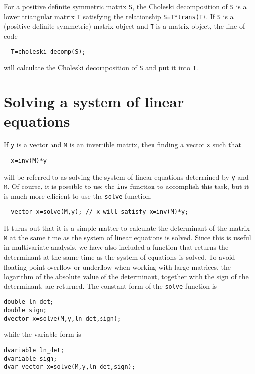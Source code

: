 \documentclass{admbmanual}
\begin{document}
For a positive definite symmetric matrix \texttt{S}, the
Choleski decomposition of \texttt{S} is a lower triangular matrix \texttt{T}
satisfying the relationship \texttt{S=T*trans(T)}. 
If \texttt{S} is a (positive definite symmetric) matrix object and
\texttt{T} is a matrix object, the line of code
\begin{lstlisting}
  T=choleski_decomp(S);
\end{lstlisting}
will calculate the Choleski decomposition of \texttt{S} and put it
into \texttt{T}.


\section{Solving a system of linear equations}

If \texttt{y} is a vector and \texttt{M} is an invertible matrix, then finding
a vector \texttt{x} such that
\begin{lstlisting}
  x=inv(M)*y
\end{lstlisting}
will be referred to as solving the system of linear equations
determined by \texttt{y} and \texttt{M}. Of course, it is possible
to use the \texttt{inv} function to accomplish this task, but it is much
more efficient to use the \texttt{solve} function.
\begin{lstlisting}
  vector x=solve(M,y); // x will satisfy x=inv(M)*y;
\end{lstlisting}

It turns out that it is a simple matter to calculate the determinant
of the matrix \texttt{M} at the same time as the system of linear
equations is solved.  Since this is useful in multivariate
analysis, we have also included a function that returns the 
determinant at the same time as the system of equations is solved.
To avoid floating point overflow or underflow when working with
large matrices, the logarithm of the absolute value of the
determinant, together with the sign of the determinant, are returned. 
The constant form of the \texttt{solve} function is
\begin{lstlisting}
double ln_det;
double sign;
dvector x=solve(M,y,ln_det,sign);
\end{lstlisting}
while the variable form is
\begin{lstlisting}
dvariable ln_det;
dvariable sign;
dvar_vector x=solve(M,y,ln_det,sign);
\end{lstlisting}
\end{document}
